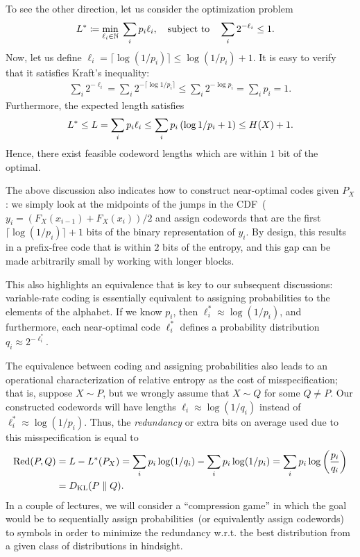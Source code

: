 \documentclass[12pt]{article}
\begin{document}
To see the other direction, let us consider the optimization problem 
\begin{align}
    L^* &\coloneqq \min_{\ell_i \in \mathbb{N}} \; \sum_i p_i \ell_i, \quad \text{subject to} \quad \sum_i 2^{-\ell_i} \leq 1.
\end{align}
Now, let us define $\ell_i =\lceil \log(1/p_i) \rceil \leq \log(1/p_i) + 1$. It is easy to verify that it satisfies Kraft's inequality: 
\begin{align}
    \sum_i 2^{-\ell_i} = \sum_i 2^{- \lceil \log 1/p_i \rceil } \leq \sum_i 2^{- \log p_i} = \sum_i p_i = 1. 
\end{align}
Furthermore, the expected length satisfies 
\begin{align}
    L^* \leq L = \sum_i p_i \ell_i \leq \sum_i p_i \left( \log 1/p_i + 1 \right) \leq H(X) + 1. 
\end{align}
Hence, there exist feasible codeword lengths which are within $1$ bit of the optimal. 

\begin{remark}
    \label{remark:length-to-code} The above discussion also indicates how to construct near-optimal codes given $P_X$: we simply look at the midpoints of the jumps in the CDF~($y_i = (F_X(x_{i-1}) + F_X(x_i))/2$ and assign codewords that are the first $\lceil \log(1/p_i)\rceil + 1$ bits of the binary representation of $y_i$. By design, this results in a prefix-free code that is within $2$ bits of the entropy, and this gap can be made arbitrarily small by working with longer blocks. 

    This also highlights an equivalence that is key to our subsequent discussions: variable-rate coding is essentially equivalent to assigning probabilities to the elements of the alphabet. If we know $p_i$, then $\ell^*_i \approx \log(1/p_i)$, and furthermore, each near-optimal code $\ell^*_i$ defines a probability distribution $q_i \approx 2^{-\ell^*_i}$. 
\end{remark}

\begin{remark}
    \label{remark:redundancy} The equivalence between coding and assigning probabilities also leads to an operational characterization of relative entropy as the cost of misspecification; that is, suppose $X \sim P$, but we wrongly assume that $X \sim Q$ for some $Q \neq P$. Our constructed codewords will have lengths $\ell_i \approx \log(1/q_i)$ instead of $\ell^*_i \approx \log(1/p_i)$. Thus, the \emph{redundancy} or extra bits on average used due to this misspecification is equal to 
    \begin{align}
        \mathrm{Red}(P, Q) &= L - L^*(P_X) = \sum_i p_i \log(1/q_i) - \sum_i p_i \log(1/p_i) = \sum_i p_i \log \left( \frac{p_i}{q_i} \right) \\
        &= D_{\text{KL}}(P \parallel Q). 
    \end{align}
	In a couple of lectures, we will consider a ``compression game'' in which the goal would be to sequentially assign probabilities~(or equivalently assign codewords) to symbols in order to minimize the redundancy w.r.t. the best distribution from a given class of distributions in hindsight. 
\end{remark}

\end{document}
